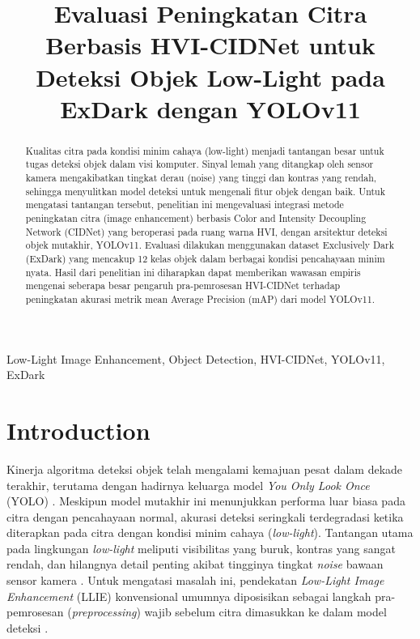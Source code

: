 \documentclass[conference]{IEEEtran}
\begin{document}
\title{Evaluasi Peningkatan Citra Berbasis HVI-CIDNet untuk Deteksi Objek Low-Light pada ExDark dengan YOLOv11}

\author{
}

\maketitle

\begin{abstract}
Kualitas citra pada kondisi minim cahaya (low-light) menjadi tantangan besar untuk tugas deteksi objek dalam visi komputer. Sinyal lemah yang ditangkap oleh sensor kamera mengakibatkan tingkat derau (noise) yang tinggi dan kontras yang rendah, sehingga menyulitkan model deteksi untuk mengenali fitur objek dengan baik. Untuk mengatasi tantangan tersebut, penelitian ini mengevaluasi integrasi metode peningkatan citra (image enhancement) berbasis Color and Intensity Decoupling Network (CIDNet) yang beroperasi pada ruang warna HVI, dengan arsitektur deteksi objek mutakhir, YOLOv11. Evaluasi dilakukan menggunakan dataset Exclusively Dark (ExDark) yang mencakup 12 kelas objek dalam berbagai kondisi pencahayaan minim nyata. Hasil dari penelitian ini diharapkan dapat memberikan wawasan empiris mengenai seberapa besar pengaruh pra-pemrosesan HVI-CIDNet terhadap peningkatan akurasi metrik mean Average Precision (mAP) dari model YOLOv11.
\end{abstract}

\begin{IEEEkeywords}
Low-Light Image Enhancement, Object Detection, HVI-CIDNet, YOLOv11, ExDark
\end{IEEEkeywords}

\section{Introduction}
Kinerja algoritma deteksi objek telah mengalami kemajuan pesat dalam dekade terakhir, terutama dengan hadirnya keluarga model \textit{You Only Look Once} (YOLO) \cite{terven2023yoloreview}. Meskipun model mutakhir ini menunjukkan performa luar biasa pada citra dengan pencahayaan normal, akurasi deteksi seringkali terdegradasi ketika diterapkan pada citra dengan kondisi minim cahaya (\textit{low-light}). Tantangan utama pada lingkungan \textit{low-light} meliputi visibilitas yang buruk, kontras yang sangat rendah, dan hilangnya detail penting akibat tingginya tingkat \textit{noise} bawaan sensor kamera \cite{loh2019exdark}. Untuk mengatasi masalah ini, pendekatan \textit{Low-Light Image Enhancement} (LLIE) konvensional umumnya diposisikan sebagai langkah pra-pemrosesan (\textit{preprocessing}) wajib sebelum citra dimasukkan ke dalam model deteksi \cite{liu2021benchmark}.
\end{document}
